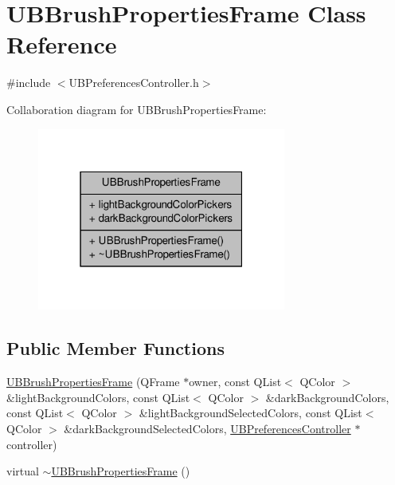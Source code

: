 \hypertarget{class_u_b_brush_properties_frame}{\section{U\-B\-Brush\-Properties\-Frame Class Reference}
\label{d4/da2/class_u_b_brush_properties_frame}
}


{\ttfamily \#include $<$U\-B\-Preferences\-Controller.\-h$>$}



Collaboration diagram for U\-B\-Brush\-Properties\-Frame\-:
\nopagebreak
\begin{figure}[H]
\begin{center}
\leavevmode
\includegraphics[width=232pt]{db/dde/class_u_b_brush_properties_frame__coll__graph}
\end{center}
\end{figure}
\subsection*{Public Member Functions}
\begin{DoxyCompactItemize}
\item 
\hyperlink{class_u_b_brush_properties_frame_a9f445aecc3bffe1c904be32621ec4888}{U\-B\-Brush\-Properties\-Frame} (Q\-Frame $\ast$owner, const Q\-List$<$ Q\-Color $>$ \&light\-Background\-Colors, const Q\-List$<$ Q\-Color $>$ \&dark\-Background\-Colors, const Q\-List$<$ Q\-Color $>$ \&light\-Background\-Selected\-Colors, const Q\-List$<$ Q\-Color $>$ \&dark\-Background\-Selected\-Colors, \hyperlink{class_u_b_preferences_controller}{U\-B\-Preferences\-Controller} $\ast$controller)
\item 
virtual \hyperlink{class_u_b_brush_properties_frame_aceffbb52cd19ba4d583a75719619ca9e}{$\sim$\-U\-B\-Brush\-Properties\-Frame} ()
\end{DoxyCompactItemize}
